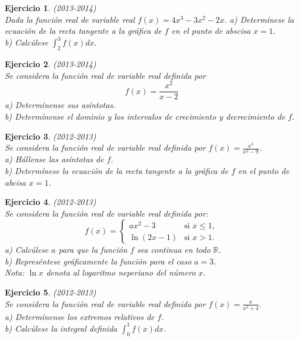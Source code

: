 \documentclass[12pt, a4paper]{amsart}
\newtheorem{ejer}{Ejercicio}
\begin{document}
\begin{ejer}\em (2013-2014)\\
Dada la función real de variable real $f(x)=4x^3-3x^2-2x.$
a) Determínese la ecuación de la recta tangente a la gráfica de $f$ en el punto de abscisa $x=1.$\\
b) Calcúlese $\int_2^3f(x)dx.$
\end{ejer}

\begin{ejer}\em (2013-2014)\\
Se considera la función real de variable real definida por 
\[f(x)=\frac{x^2}{x-2}\]
a) Determínense sus asíntotas.\\
b) Determínense el dominio y los intervalos de crecimiento y decrecimiento de $f.$
\end{ejer}


\begin{ejer}\em (2012-2013)\\
Se considera la función real de variable real definida por $f(x)=\frac{x^3}{x^2-9}$.\\
a) Hállense las asíntotas de $f$.\\
b) Determínese la ecuación de la recta tangente a la gráfica de  $f$ en el punto de abcisa $x=1$.
\end{ejer}

\begin{ejer}\em (2012-2013)\\
Se considera la función real de variable real definida por:
\begin{equation*}
f(x)=\left \{ \begin{matrix} ax^2-3 & \mbox{si } x\leq 1,
\\ \ln(2x-1) & \mbox{si } x > 1. \end{matrix}\right. 
\end{equation*}
a) Calcúlese $a$ para que la función $f$ sea continua en todo $\mathbb{R}$.\\
b) Represéntese gráficamente la función para el caso $a=3$.\\
Nota: $\ln x$ denota al logaritmo neperiano del número $x$.
\end{ejer}

\begin{ejer}\em (2012-2013)\\
Se considera la función real de variable real definida por $f(x)=\frac{x}{x^2+4}$.\\
a) Determínense los extremos relativos de $f$.\\
b) Calcúlese la integral definida $\int_0^1f(x)dx$.
\end{ejer}
\end{document}
